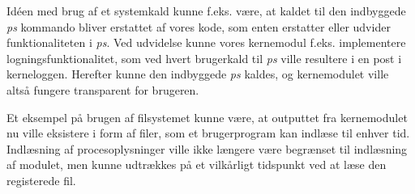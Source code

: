 Idéen med brug af et systemkald kunne f.eks. være, at kaldet til den indbyggede \textit{ps} kommando bliver erstattet af vores kode, som enten erstatter eller udvider funktionaliteten i \textit{ps}. Ved udvidelse kunne vores kernemodul f.eks. implementere logningsfunktionalitet, som ved hvert brugerkald til \textit{ps} ville resultere i en post i kerneloggen. Herefter kunne den indbyggede \textit{ps} kaldes, og kernemodulet ville altså fungere transparent for brugeren.

Et eksempel på brugen af filsystemet kunne være, at outputtet fra kernemodulet nu ville eksistere i form af filer, som et brugerprogram kan indlæse til enhver tid. Indlæsning af procesoplysninger ville ikke længere være begrænset til indlæsning af modulet, men kunne udtrækkes på et vilkårligt tidspunkt ved at læse den registerede fil.